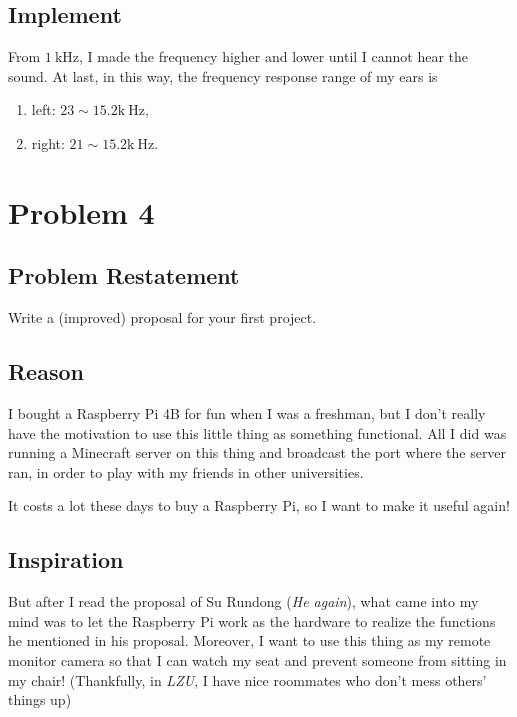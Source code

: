 \documentclass{article}
\begin{document}
\subsection{Implement}
From $1~\mathrm{kHz}$, I made the frequency higher and lower until I cannot hear the sound.
At last, in this way, the frequency response range of my ears is 
\begin{enumerate}
    \item left: $23 \sim 15.2 \mathrm{k~Hz}$,
    \item right: $21 \sim 15.2 \mathrm{k~Hz}$.
\end{enumerate}

\section{Problem 4}
\subsection{Problem Restatement}
Write a (improved) proposal for your first project.
\subsection{Reason}
I bought a Raspberry Pi 4B for fun when I was a freshman, but I don't really have the motivation to use this little thing as something functional. All I did was running a Minecraft server on this thing and broadcast the port where the server ran, in order to play with my friends in other universities.

It costs a lot these days to buy a Raspberry Pi, so I want to make it useful again!
\subsection{Inspiration}
But after I read the proposal of Su Rundong (\emph{He again}), what came into my mind was to let the Raspberry Pi work as the hardware to realize the functions he mentioned in his proposal. Moreover, I want to use this thing as my remote monitor camera so that I can watch my seat and prevent someone from sitting in my chair! (Thankfully, in \emph{LZU}, I have nice roommates who don't mess others' things up)
\end{document}
